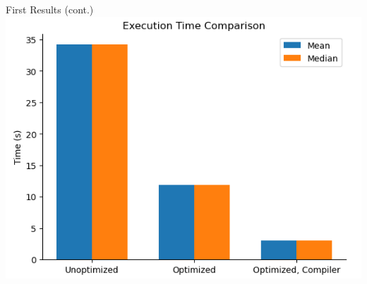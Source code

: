 \documentclass[compress,aspectratio=169]{beamer}
\begin{document}
\begin{frame}{First Results (cont.)}
\centering
    \includegraphics[height=.9\textheight]{./assets/ndim_first_bench.png}
\end{frame}
\end{document}
